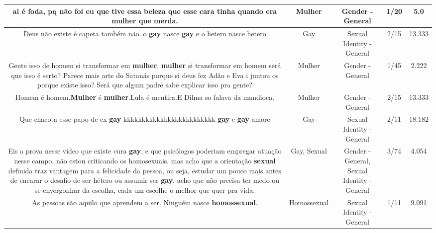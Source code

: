 \documentclass[11pt]{article}
\newlength\mylength
\begin{document}
\begin{center}
\begin{longtable}{|C{.65\mylength}|C{.30\mylength}|C{.12\mylength}|C{.12\mylength}|C{.12\mylength}|}
  \small ai é foda, pq não foi eu que tive essa beleza que esse cara tinha quando era \textbf{mulher} que merda.\normalsize   & Mulher & Gender - General & 1/20 & 5.0 \\  \hline
  \small Deus não existe é capeta também não..o \textbf{gay} nasce \textbf{gay} e o hetero nasce hetero\normalsize   & Gay & Sexual Identity - General & 2/15 & 13.333 \\  \hline
  \small Gente isso de homem si transformar em \textbf{mulher}, \textbf{mulher} si transformar em homem será que isso é serto? Parece mais arte do Satanás porque si deus fez Adão e Eva i juntou os porque existe isso? Será que algum padre sabe explicar isso pra gente?\normalsize   & Mulher & Gender - General & 1/45 & 2.222 \\  \hline
  \small Homem é homem.\textbf{Mulher} é \textbf{mulher}.Lula é mentira.E Dilma so falava da mandioca.\normalsize   & Mulher & Gender - General & 2/15 & 13.333 \\  \hline
  \small Que chacota esse papo de ex-\textbf{gay} kkkkkkkkkkkkkkkkkkkkkkkkk \textbf{gay} e \textbf{gay} amore\normalsize   & Gay & Sexual Identity - General & 2/11 & 18.182 \\  \hline
  \small Eis a prova nesse vídeo que existe cura \textbf{gay}, e que psicólogos poderiam empregar atuação nesse campo, não estou criticando os homosexuais, mas acho que a orientação \textbf{sexual} definida traz vantagem para a felicidade da pessoa, ou seja, estudar um pouco mais antes de encarar o desafio de ser hétero ou assumir ser \textbf{gay}, acho que não precisa ter medo ou se envergonhar da escolha, cada um escolhe o melhor que quer pra vida.\normalsize   & Gay, Sexual & Gender - General, Sexual Identity - General & 3/74 & 4.054 \\  \hline
  \small As pessoas são aquilo que aprendem a ser. Ninguém nasce \textbf{homossexual}.\normalsize   & Homossexual & Sexual Identity - General & 1/11 & 9.091 \\  \hline

\end{longtable}
\end{center}
\end{document}
